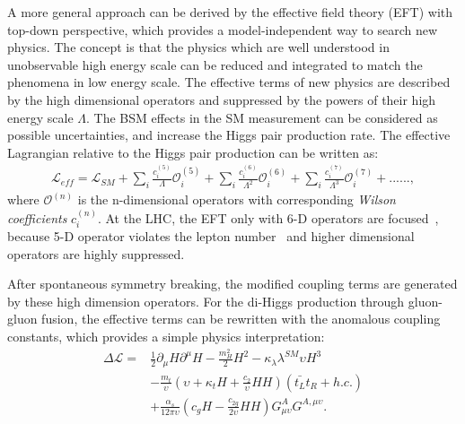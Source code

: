 A more general approach can be derived by the effective field theory (EFT) with top-down perspective, which provides a model-independent way to search new physics.
The concept is that the physics which are well understood in unobservable high energy scale can be reduced and integrated to match the phenomena in low energy scale.
The effective terms of new physics are described by the high dimensional operators and suppressed by the powers of their high energy scale $\Lambda$.
The BSM effects in the SM measurement can be considered as possible uncertainties, and increase the Higgs pair production rate.
The effective Lagrangian relative to the Higgs pair production can be written as:
\begin{equation} \label{eq:EffectiveL}
  \begin{aligned}
	\mathcal{L}_{eff} = \mathcal{L}_{SM} + 
	\sum_{i} \frac{c_{i}^{(5)}}{\Lambda}\mathcal{O}_{i}^{(5)} + 
	\sum_{i} \frac{c_{i}^{(6)}}{\Lambda^{2}}\mathcal{O}_{i}^{(6)} +
	\sum_{i} \frac{c_{i}^{(7)}}{\Lambda^{3}}\mathcal{O}_{i}^{(7)} + ...... ,
  \end{aligned}
\end{equation}
where $\mathcal{O}^{(n)}$ is the n-dimensional operators with corresponding {\em Wilson coefficients \/} $c_{i}^{(n)}$.
At the LHC, the EFT only with 6-D operators are focused~\cite{1610.07922, 1008.4884, 1410.3471}, because 5-D operator violates the lepton number~\cite{Buchmller1986} and higher dimensional operators are highly suppressed.

After spontaneous symmetry breaking, the modified coupling terms are generated by these high dimension operators. 
For the di-Higgs production through gluon-gluon fusion, the effective terms can be rewritten with the anomalous coupling constants, which provides a simple physics interpretation:~\cite{1507.02245}
\begin{equation} \label{eq:EffectiveLwithAnomalous}
  \begin{aligned}
	\Delta\mathcal{L} =
        & \frac{1}{2}\partial_{\mu}H\partial^{\mu}H-\frac{m_{H}^{2}}{2}H^{2}-\kappa_{\lambda}\lambda^{SM}\upsilon H^{3} \\
		& - \frac{m_{t}}{\upsilon}(\upsilon+\kappa_{t}H+\frac{c_{2}}{\upsilon}HH)(\bar{t_{L}}t_{R}+h.c.) \\
		& + \frac{\alpha_{s}}{12\pi\upsilon}(c_{g}H-\frac{c_{2g}}{2\upsilon}HH)G_{\mu\upsilon}^{A}G^{A,\mu\upsilon} .
  \end{aligned}
\end{equation}


